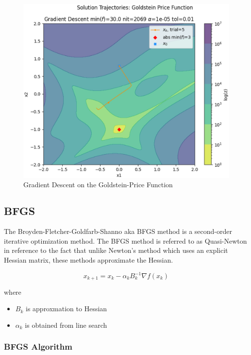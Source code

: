 \documentclass{vgtc}                          %
\begin{document}
\begin{figure}[tb]
\centering
\includegraphics[width=\columnwidth]{figures/pictures/images/gradient_descent-goldstein_price-plot2d-05.eps}
\caption{Gradient Descent on the Goldstein-Price Function}
\label{fig:gradient_descent-goldstein_price}
\end{figure}

\subsection{BFGS}

The Broyden-Fletcher-Goldfarb-Shanno aka BFGS method \cite{Heath:2018} is a second-order iterative optimization method.  The BFGS method is referred to as Quasi-Newton in reference to the fact that unlike Newton's method which uses an explicit Hessian matrix, these methods approximate the Hessian.

$$
x_{k+1} = x_k - \alpha_k B_k^{-1} \nabla f(x_k)
$$

where
\begin{itemize}
\item $B_k$ is approxmation to Hessian
\item $\alpha_k$ is obtained from line search
\end{itemize}

\subsubsection{BFGS Algorithm}
\end{document}
